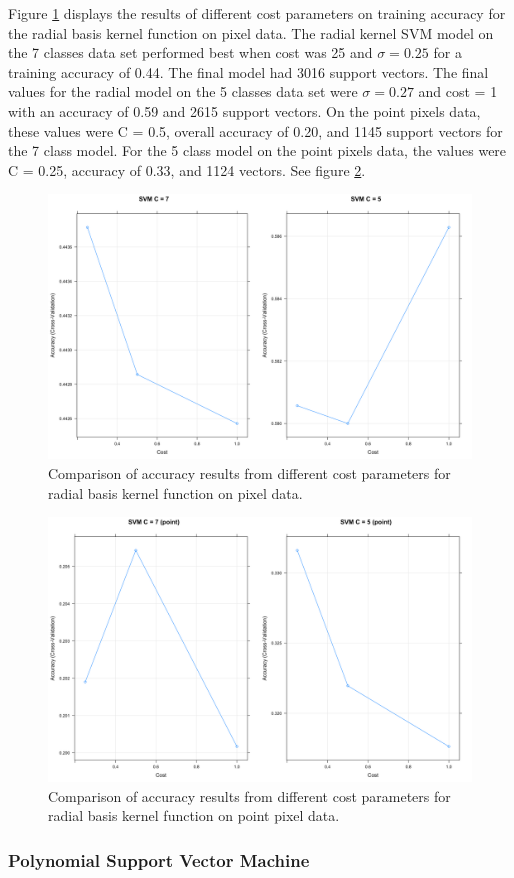 \documentclass[12pt,twoside]{reedthesis}
\begin{document}
Figure \ref{fig:svm2} displays the results of different cost parameters on training accuracy for the radial basis kernel function on pixel data. The radial kernel SVM model on the 7 classes data set performed best when cost was 25 and \(\sigma = 0.25\) for a training accuracy of 0.44. The final model had 3016 support vectors. The final values for the radial model on the 5 classes data set were \(\sigma = 0.27\) and cost = 1 with an accuracy of 0.59 and 2615 support vectors. On the point pixels data, these values were C = 0.5, overall accuracy of 0.20, and 1145 support vectors for the 7 class model. For the 5 class model on the point pixels data, the values were C = 0.25, accuracy of 0.33, and 1124 vectors. See figure \ref{fig:svm2c}.
\begin{figure}

{\centering \includegraphics[width=0.9\linewidth]{figure/svm2} 

}

\caption{Comparison of accuracy results from different cost parameters for radial basis kernel function on pixel data.}\label{fig:svm2}
\end{figure}
\begin{figure}

{\centering \includegraphics[width=0.9\linewidth]{figure/svm2c} 

}

\caption{Comparison of accuracy results from different cost parameters for radial basis kernel function on point pixel data.}\label{fig:svm2c}
\end{figure}
\hypertarget{polynomial-support-vector-machine}{%
\subsubsection{Polynomial Support Vector Machine}\label{polynomial-support-vector-machine}}
\end{document}

